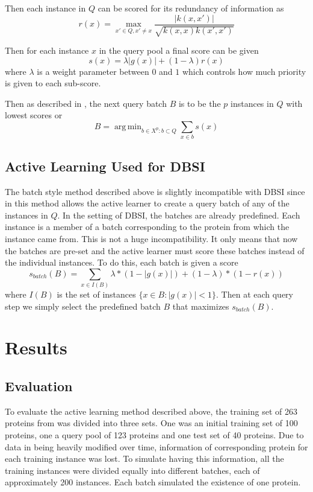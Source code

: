 \documentclass{article}
\DeclareMathOperator*{\argmin}{arg\,min}
\begin{document}
Then each instance in $Q$ can be scored for its redundancy of information as
\[
r(x) = \max_{x' \in Q, x' \neq x} \frac{|k(x,x')|}{\sqrt{k(x,x)k(x', x')}}
\]

Then for each instance $x$ in the query pool a final score can be given
\[
s(x) = \lambda |g(x)| + (1- \lambda) r(x)
\]
where $\lambda$ is a weight parameter between $0$ and $1$ which controls how much priority is given to each sub-score. 

Then as described in \cite{active_learning}, the next query batch $B$ is to be the $p$ instances in $Q$ with lowest scores or
\[
B = \argmin_{b \in X^p : b \subset Q} \sum_{x \in b} s(x)
\]

\subsection*{Active Learning Used for DBSI}
The batch style method described above is slightly incompatible with DBSI since in \cite{active_learning} this method allows the active learner to create a query batch of any of the instances in $Q$. In the setting of DBSI, the batches are already predefined. Each instance is a member of a batch corresponding to the protein from which the instance came from. This is not a huge incompatibility. It only means that now the batches are pre-set and the active learner must score these batches instead of the individual instances. To do this, each batch is given a score
\[
s_{batch}(B) = \sum_{x \in I(B)} \lambda * (1- |g(x)|) + (1-\lambda) * (1 - r(x))
\]
where $I(B)$ is the set of instances $\{x \in B : |g(x)| < 1\}$. Then at each query step we simply select the predefined batch $B$ that maximizes $s_{batch}(B)$.

\section*{Results}
\subsection*{Evaluation}
To evaluate the active learning method described above, the training set of 263 proteins from \cite{dbsi_server} was divided into three sets. One was an initial training set of 100 proteins, one a query pool of 123 proteins and one test set of 40 proteins. Due to data in \cite{dbsi_server} being heavily modified over time, information of corresponding protein for each training instance was lost. To simulate having this information, all the training instances were divided equally into different batches, each of approximately 200 instances. Each batch simulated the existence of one protein. 
\end{document}
